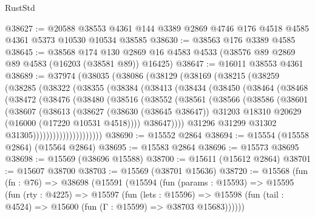\begin{lexlean}{RustStd}
\begin{coremodule}
@38627 := @20588
    @38553
    @4361
    @144
    @3389
    @2869
    @4746
    @176
    @4518
    @4585
    @4361
    @5373
    @10530
    @10534
    @38585
@38630 := @38563 @176 @3389 @4585
@38645 := @38568
    @174
    @130
    @2869
    @16
    @4583
    @4533
    (@38576 @89 @2869 @89 @4583 (@16203 (@38581 @89)) @16425)
@38647 := @16011 @38553 @4361
@38689 := @37974
    (@38035
      (@38086
        (@38129
          (@38169
            (@38215
              (@38259
                (@38285
                  (@38322
                    (@38355
                      (@38384
                        (@38413
                          (@38434
                            (@38450
                              (@38464
                                (@38468
                                  (@38472
                                    (@38476
                                      (@38480
                                        (@38516
                                          (@38552
                                            (@38561
                                              (@38566
                                                (@38586
                                                  (@38601
                                                    (@38607
                                                      (@38613
                                                        (@38627
                                                          (@38630 (@38645 @38647))
                                                          @31203
                                                          @18310
                                                          @20629
                                                          (@16000 (@17220 @10531 @4518))))
                                                      @38647))))
                                              @31296
                                              @31299
                                              @31302
                                              @31305)))))))))))))))))))))
@38690 := @15552 @2864
@38694 := @15554 (@15558 @2864) (@15564 @2864)
@38695 := @15583 @2864
@38696 := @15573 @38695
@38698 := @15569 (@38696 @15588)
@38700 := @15611 (@15612 @2864)
@38701 := @15607 @38700
@38703 := @15569 (@38701 @15636)
@38720 := @15568
    (fun (fn : @76) =>
    @38698
      (@15591
        (@15594
          (fun (params : @15593) =>
          @15595
            (fun (rty : @4225) =>
            @15597
              (fun (lets : @15596) =>
              @15598 (fun (tail : @4524) => @15600 (fun (Γ : @15599) => @38703 @15683))))))

\end{coremodule}
\end{lexlean}
